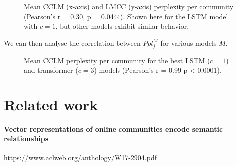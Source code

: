\documentclass[11pt,a4paper]{article}
\begin{document}

\begin{figure}
  \caption{%
    Mean CCLM (x-axis) and LMCC (y-axis) perplexity per community (Pearson's r = \num{0.30}, p = \num{0.0444}).
    Shown here for the LSTM model with $c = 1$, but other models exhibit similar behavior.
  }
  \label{fig:cclm_lmcc_ppl}
\end{figure}


We can then analyse the correlation between \(Ppl^M_j\) for various models $M$.

\begin{figure}
  \caption{%
    Mean CCLM perplexity per community for the best LSTM ($c = 1$) and transformer ($c = 3$) models
    (Pearson's r = \num{0.99} p < \num{0.0001}).
  }
  \label{fig:lmcc_ppl}
\end{figure}





\section{Related work}

\paragraph{Vector representations of online communities encode semantic relationships}
https://www.aclweb.org/anthology/W17-2904.pdf
\end{document}
